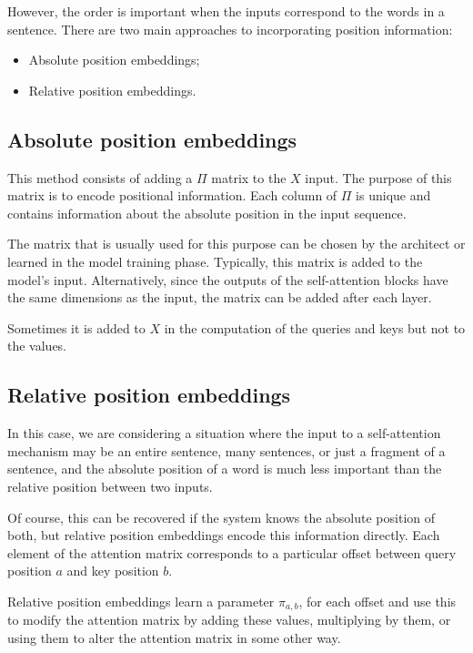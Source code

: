 However, the order is important when the inputs correspond to the words in a sentence. There are two main approaches to 
incorporating position information: 
\begin{itemize}
    \item Absolute position embeddings;
    \item Relative position embeddings.
\end{itemize}
\subsection{Absolute position embeddings}
This method consists of adding a $\Pi$ matrix to the $X$ input. The purpose of this matrix is to encode positional
information. Each column of $\Pi$ is unique and contains information about the absolute position in the input sequence. 

The matrix that is usually used for this purpose can be chosen by the architect or learned in the model training phase. 
Typically, this matrix is added to the model's input. Alternatively, since the outputs of the self-attention blocks have
the same dimensions as the input, the matrix can be added after each layer.

\begin{note}
    Sometimes it is added to $X$ in the computation of the queries and keys but not to the values.
\end{note}

\subsection{Relative position embeddings}
In this case, we are considering a situation where the input to a self-attention mechanism may be an entire sentence, 
many sentences, or just a fragment of a sentence, and the absolute position of a word is much less important than the 
relative position between two inputs.

Of course, this can be recovered if the system knows the absolute position of both, but relative position embeddings 
encode this information directly. Each element of the attention matrix corresponds to a particular offset between query 
position $a$ and key position $b$. 

Relative position embeddings learn a parameter $\pi_{a, b}$, for each offset and use this to modify the attention matrix 
by adding these values, multiplying by them, or using them to alter the attention matrix in some other way.
